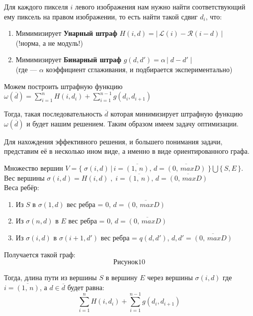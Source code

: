	Для каждого пикселя $i$ левого изображения нам нужно найти соответствующий ему пиксель на правом изображении, то есть найти такой сдвиг $d_i$, что:
	\begin{enumerate}
	
	\item Мимимизирует \textbf{Унарный штраф} $H(i, d) = | \, \mathcal{L}(i)- \mathcal{R}(i - d) \, |$\\
	(!норма, а не модуль!)
	
	\item Мимимизирует \textbf{Бинарный штраф} $g(d, d') = \alpha \, | \; d - d' \; |$ \\
	(где  --- $\alpha$ коэффициент сглаживания, и подбирается экспериментально)
	
	\end{enumerate}
	
			
	
	Можем построить штрафную функцию 
	$\omega (\overline{d}) = \sum\limits_{i=1}^n H(i, d_i) + \sum\limits_{i=1}^{n-1} g(d_i, d_{i+1})$
	
	Тогда, такая последовательность $\overline{d}$ которая минимизирует штрафную функцию $\omega (\overline{d})$ и будет нашим решением. Таким образом имеем задачу оптимизации.
	
	Для нахождения эффективного решения, и большего понимания задачи,  представим её в несколько ином виде, а именно в виде ориентированного графа. 
	
	Множество вершин $V = \{ \; \sigma(i, d) \, | \, i = \overline{(1,\, n)}, \, d = \overline{(0, \, maxD )} \; \} \bigcup \{\,S, E\,\}$.\\
	Вес вершины $\sigma(i, d) = H(i, d) \;, \; i = \overline{(1,\, n)}, \, d = \overline{(0, \, maxD )}$\\
	Веса ребёр: 
	\begin{enumerate}
	\item Из $S$ в $\sigma(1, d)$ вес ребра = $0$, $d = \overline{(0,\, maxD)}$
	\item Из $\sigma(n, d)$ в $E$ вес ребра = $0$, $d = \overline{(0,\, maxD)}$
	\item Из $\sigma(i, d)$ в $\sigma(i+1, d')$ вес ребра = $q(d, d')$, $d, d' = \overline{(0,\, maxD)}$
	\end{enumerate}	
	
	Получается такой граф:
	$$Рисунок 10$$

 	
 	Тогда, длина пути из вершины $S$ в вершину $E$ через вершины $\sigma(i, d)$ где $i = \overline{(1,\, n)}$, а $d \in \overline{d}$ будет равна:
 	$$\sum\limits_{i=1}^n H(i, d_i) + \sum\limits_{i=1}^{n-1} g(d_i, d_{i+1})$$
 	
